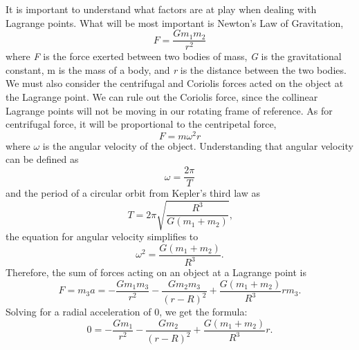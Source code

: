 It is important to understand what factors are at play when dealing with Lagrange points.
What will be most important is Newton's Law of Gravitation,
\begin{equation}
	F = \frac{Gm_1m_2}{r^2}
\end{equation}
where \textit{F} is the force exerted between two bodies of mass, \textit{G} is the gravitational constant, m is the mass of a body, and \textit{r} is the distance between the two bodies.
We must also consider the centrifugal and Coriolis forces acted on the object at the Lagrange point.
We can rule out the Coriolis force, since the collinear Lagrange points will not be moving in our rotating frame of reference.
As for centrifugal force, it will be proportional to the centripetal force,
\begin{equation*}
	F = m\omega^2r
\end{equation*}
where $\omega$ is the angular velocity of the object. Understanding that angular velocity can be defined as
\begin{equation*}
	\omega = \frac{2\pi}{T}
\end{equation*}
and the period of a circular orbit from Kepler's third law as
\begin{equation*}
	T = 2\pi\sqrt{\frac{R^3}{G(m_1+m_2)}} \text{,} %
\end{equation*}
the equation for angular velocity simplifies to
\begin{equation*}
	\omega^2 = \frac{G(m_1+m_2)}{R^3} \text{.} %
\end{equation*} %
Therefore, the sum of forces acting on an object at a Lagrange point is
\begin{equation*}
	F = m_3a = -\frac{Gm_1m_3}{r^2} - \frac{Gm_2m_3}{(r - R)^2} + \frac{G(m_1+m_2)}{R^3}rm_3 \text{.}
\end{equation*}
Solving for a radial acceleration of 0, we get the formula:
\begin{equation*}
	0 = -\frac{Gm_1}{r^2} - \frac{Gm_2}{(r - R)^2} + \frac{G(m_1+m_2)}{R^3}r \text{.}
\end{equation*}
